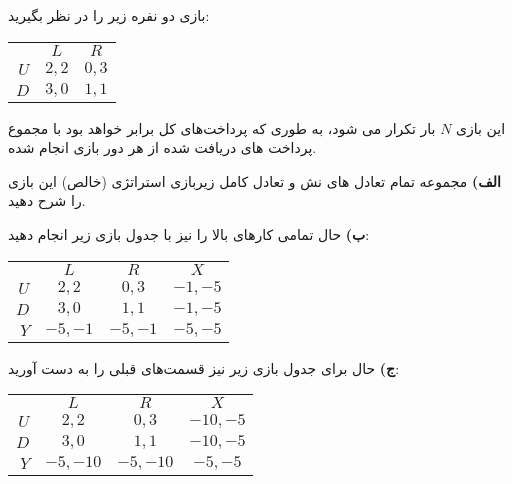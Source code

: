 بازی دو نفره زیر را در نظر بگیرید:
\LTR 
\begin{latin}
    \begin{center}
        \begin{tabular}{r | c | c |}
            \multicolumn{1}{r}{} &
            \multicolumn{1}{c}{$L$} &
            \multicolumn{1}{c}{$R$} \\ \cline{2-3}
            $U$       & $2,2$   & $0,3$  \\ \cline{2-3}
            $D$       & $3,0$   & $1,1$  \\ \cline{2-3}
        \end{tabular}
    \end{center}
\end{latin}
\RTL
این بازی $N$ بار تکرار می شود، به طوری که پرداخت‌های کل برابر خواهد بود با مجموع پرداخت های دریافت شده از هر دور بازی انجام شده.

\vspace*{10pt}
\textbf{الف)}
مجموعه تمام تعادل های نش و تعادل کامل زیربازی استراتژی (خالص) این بازی را شرح دهید.

\vspace*{5pt}
\textbf{ب)}
حال تمامی کارهای بالا را نیز با جدول بازی زیر انجام دهید:
\LTR 
\begin{latin}
    \begin{center}
        \begin{tabular}{r | c | c | c |}
            \multicolumn{1}{r}{} &
            \multicolumn{1}{c}{$L$} &
            \multicolumn{1}{c}{$R$} &
            \multicolumn{1}{c}{$X$} \\ \cline{2-4}
            $U$       & $2,2$   & $0,3$   & $-1,-5$  \\ \cline{2-4}
            $D$       & $3,0$   & $1,1$   & $-1,-5$  \\ \cline{2-4}
            $Y$       & $-5,-1$ & $-5,-1$ & $-5,-5$  \\ \cline{2-4}
        \end{tabular}
    \end{center}
\end{latin}
\RTL

\vspace*{5pt}
\textbf{ج)}
حال برای جدول بازی زیر نیز قسمت‌های قبلی را به دست آورید:
\LTR 
\begin{latin}
    \begin{center}
        \begin{tabular}{r | c | c | c |}
            \multicolumn{1}{r}{} &
            \multicolumn{1}{c}{$L$} &
            \multicolumn{1}{c}{$R$} &
            \multicolumn{1}{c}{$X$} \\ \cline{2-4}
            $U$       & $2,2$    & $0,3$    & $-10,-5$  \\ \cline{2-4}
            $D$       & $3,0$    & $1,1$    & $-10,-5$  \\ \cline{2-4}
            $Y$       & $-5,-10$ & $-5,-10$ & $-5,-5$   \\ \cline{2-4}
        \end{tabular}
    \end{center}
\end{latin}
\RTL